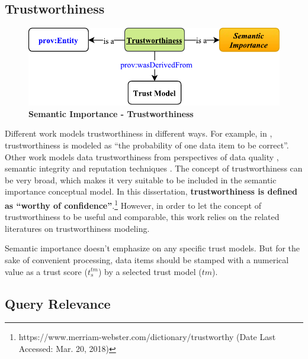 \subsection{Trustworthiness}

\begin{figure}[!htbp]
	\centering
    \includegraphics[width=5in]{img/3-sit.pdf}
    \caption{\textbf{Semantic Importance - Trustworthiness}}
    \label{fig:3-sit}
\end{figure}

Different work models trustworthiness in different ways.
For example, in \cite{bertino2009challenge}, trustworthiness is modeled as ``the probability of one data item to be correct''. 
Other work models data trustworthiness from perspectives of data quality \cite{juran1999quality} \cite{kahn2002information} \cite{prince2004semiotic} \cite{wand1996anchoring}, semantic integrity \cite{date2004database} and reputation techniques \cite{kamvar2003eigentrust} \cite{levien2009attack}. 
The concept of trustworthiness can be very broad, which makes it very suitable to be included in the semantic importance conceptual model. 
In this dissertation, \textbf{trustworthiness is defined as ``worthy of confidence''}.\footnote{https://www.merriam-webster.com/dictionary/trustworthy (Date Last Accessed: Mar. 20, 2018)}
However, in order to let the concept of trustworthiness to be useful and comparable, this work relies on the related literatures on trustworthiness modeling. 

Semantic importance doesn't emphasize on any specific trust models.
But for the sake of convenient processing, data items should be stamped with a numerical value as a trust score ($t^{tm}_{s}$) by a selected trust model ($tm$). 
%
\subsection{Query Relevance}

